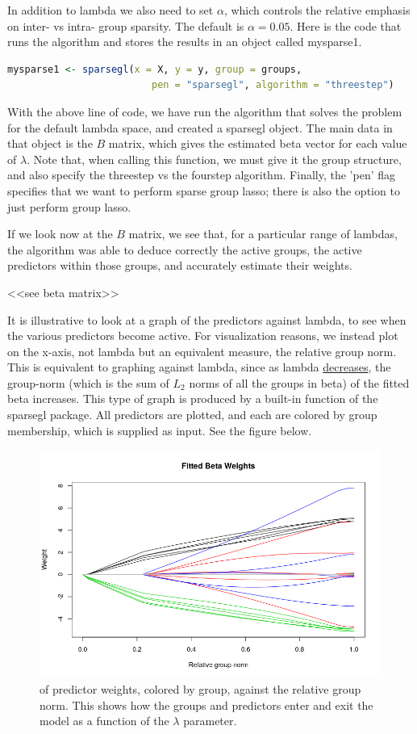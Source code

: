 \documentclass[12pt]{article}
\begin{document}
In addition to lambda we also need to set $\alpha$, which controls the relative emphasis on inter- vs intra- group sparsity. The default is $\alpha = 0.05$. Here is the code that runs the algorithm and stores the results in an object called mysparse1.

\begin{lstlisting}[language=R]
mysparse1 <- sparsegl(x = X, y = y, group = groups,
                         pen = "sparsegl", algorithm = "threestep")
\end{lstlisting}
With the above line of code, we have run the algorithm that solves the problem for the default lambda space, and created a sparsegl object. The main data in that object is the $B$ matrix, which gives the estimated beta vector for each value of $\lambda$. Note that, when calling this function, we must give it the group structure, and also specify the threestep vs the fourstep algorithm. Finally, the 'pen' flag specifies that we want to perform sparse group lasso; there is also the option to just perform group lasso.

If we look now at the $B$ matrix, we see that, for a particular range of lambdas, the algorithm was able to deduce correctly the active groups, the active predictors within those groups, and accurately estimate their weights.

<<see beta matrix>>

It is illustrative to look at a graph of the predictors against lambda, to see when the various predictors become active. For visualization reasons, we instead plot on the x-axis, not lambda but an equivalent measure, the relative group norm. This is equivalent to graphing against lambda, since as lambda \underline{decreases}, the group-norm (which is the sum of $L_2$ norms of all the groups in beta) of the fitted beta increases. This type of graph is produced by a built-in function of the sparsegl package. All predictors are plotted, and each are colored by group membership, which is supplied as input. See the figure below.


\begin{figure}[tb!]
\centering
\includegraphics[scale=0.5]{fitted_beta_weights.png}
 of predictor weights, colored by group, against the relative group norm. This shows how the groups and predictors enter and exit the model as a function of the $\lambda$ parameter.
\label{fig:colorWeights}
\end{figure}
\end{document}

